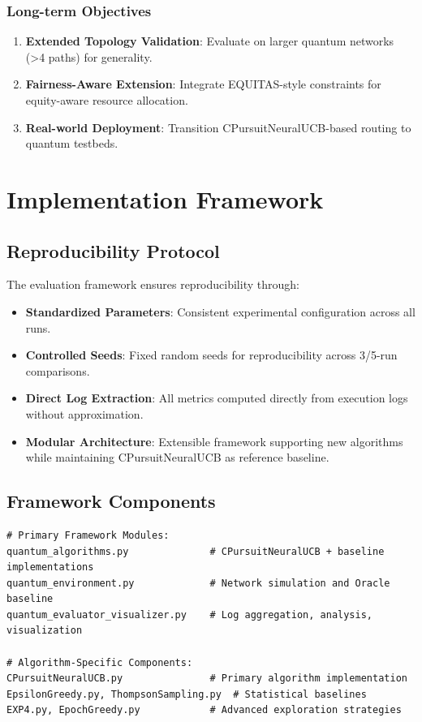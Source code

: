 \documentclass[12pt,a4paper]{article}
\begin{document}
\subsubsection{Long-term Objectives}
\begin{enumerate}
    \item \textbf{Extended Topology Validation}: Evaluate on larger quantum networks (>4 paths) for generality.
    \item \textbf{Fairness-Aware Extension}: Integrate EQUITAS-style constraints for equity-aware resource allocation.
    \item \textbf{Real-world Deployment}: Transition CPursuitNeuralUCB-based routing to quantum testbeds.
\end{enumerate}

\section{Implementation Framework}

\subsection{Reproducibility Protocol}

The evaluation framework ensures reproducibility through:

\begin{itemize}
    \item \textbf{Standardized Parameters}: Consistent experimental configuration across all runs.
    \item \textbf{Controlled Seeds}: Fixed random seeds for reproducibility across 3/5-run comparisons.
    \item \textbf{Direct Log Extraction}: All metrics computed directly from execution logs without approximation.
    \item \textbf{Modular Architecture}: Extensible framework supporting new algorithms while maintaining CPursuitNeuralUCB as reference baseline.
\end{itemize}

\subsection{Framework Components}

\begin{lstlisting}[caption=Core Implementation Architecture]
# Primary Framework Modules:
quantum_algorithms.py              # CPursuitNeuralUCB + baseline implementations
quantum_environment.py             # Network simulation and Oracle baseline
quantum_evaluator_visualizer.py    # Log aggregation, analysis, visualization

# Algorithm-Specific Components:
CPursuitNeuralUCB.py               # Primary algorithm implementation
EpsilonGreedy.py, ThompsonSampling.py  # Statistical baselines
EXP4.py, EpochGreedy.py            # Advanced exploration strategies
\end{lstlisting}
\end{document}
